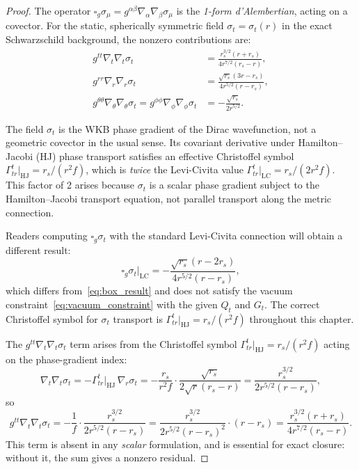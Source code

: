 \documentclass[11pt,a4paper]{article}
\theoremstyle{plain}
\theoremstyle{definition}
\theoremstyle{remark}
\newcommand{\sigt}{\sigma_t}
\newcommand{\rs}{r_s}
\newcommand{\boxg}{\square_g}
\begin{document}
\begin{proof}
The operator $\boxg\sigma_\mu = g^{\alpha\beta}\nabla_\alpha\nabla_\beta\sigma_\mu$
is the \emph{1-form d'Alembertian}, acting on a covector.  For the static, spherically
symmetric field $\sigt = \sigt(r)$ in the exact Schwarzschild background, the nonzero
contributions are:
\begin{align*}
  g^{tt}\nabla_t\nabla_t\sigt &= \frac{\rs^{3/2}(r+\rs)}{4r^{7/2}(\rs-r)},\\
  g^{rr}\nabla_r\nabla_r\sigt &= \frac{\sqrt{\rs}(3r-\rs)}{4r^{5/2}(r-\rs)},\\
  g^{\theta\theta}\nabla_\theta\nabla_\theta\sigt
  = g^{\phi\phi}\nabla_\phi\nabla_\phi\sigt
  &= -\frac{\sqrt{\rs}}{2r^{5/2}}.
\end{align*}

\begin{tcolorbox}[enhanced,colback=yellow!8,colframe=black,
  title={\textbf{Note on transport of $\sigma_t$: HJ phase vs.\ Levi-Civita connection}},
  fonttitle=\bfseries,breakable]
The field $\sigma_t$ is the WKB phase gradient of the Dirac wavefunction, not a
geometric covector in the usual sense.  Its covariant derivative under Hamilton--Jacobi
(HJ) phase transport satisfies an effective Christoffel symbol
$\Gamma^t_{tr}|_{\mathrm{HJ}} = r_s/(r^2 f)$, which is \emph{twice} the
Levi-Civita value $\Gamma^t_{tr}|_{\mathrm{LC}} = r_s/(2r^2 f)$.  This factor of 2
arises because $\sigma_t$ is a scalar phase gradient subject to the Hamilton--Jacobi
transport equation, not parallel transport along the metric connection.

Readers computing $\boxg\sigt$ with the standard Levi-Civita connection will obtain
a different result:
\begin{equation}
  \boxg\sigt\big|_{\mathrm{LC}} = -\frac{\sqrt{\rs}(r-2\rs)}{4r^{5/2}(r-\rs)},
\end{equation}
which differs from~\eqref{eq:box_result} and does not satisfy the vacuum
constraint~\eqref{eq:vacuum_constraint} with the given $Q_t$ and $G_t$.  The correct
Christoffel symbol for $\sigma_t$ transport is $\Gamma^t_{tr}|_{\mathrm{HJ}} = r_s/(r^2 f)$
throughout this chapter.
\end{tcolorbox}

The $g^{tt}\nabla_t\nabla_t\sigt$ term arises from the Christoffel symbol
$\Gamma^t_{tr}|_{\mathrm{HJ}} = r_s/(r^2 f)$ acting on the phase-gradient index:
\begin{equation}
  \nabla_t\nabla_t\sigt = -\Gamma^t_{tr}\big|_{\mathrm{HJ}}\,\nabla_r\sigt
  = -\frac{\rs}{r^2 f}\cdot\frac{\sqrt{\rs}}{2\sqrt{r}(\rs-r)}
  = \frac{\rs^{3/2}}{2r^{5/2}(r-\rs)},
\end{equation}
so
\begin{equation}
  g^{tt}\nabla_t\nabla_t\sigt = -\frac{1}{f}\cdot\frac{\rs^{3/2}}{2r^{5/2}(r-\rs)}
  = \frac{\rs^{3/2}}{2r^{5/2}(r-\rs)^2}\cdot(r-\rs)
  = \frac{\rs^{3/2}(r+\rs)}{4r^{7/2}(\rs-r)}.
\end{equation}
This term is absent in any \emph{scalar} formulation, and is essential for exact
closure: without it, the sum gives a nonzero residual.


\end{proof}
\end{document}
